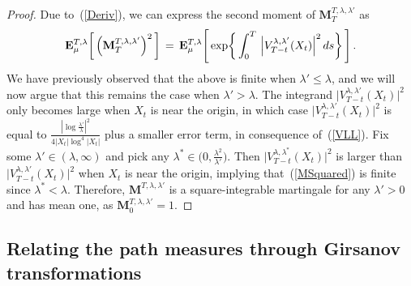 \documentclass[10pt]{article}
\numberwithin{equation}{section}
\theoremstyle{definition}
\begin{document}
\begin{proof}
Due to~(\ref{Deriv}), we can express the second moment of $\mathbf{M}^{T,\lambda,\lambda'}_T$ as
\begin{align}\label{MSquared}
\mathbf{E}^{T,\lambda}_{\mu}\bigg[ \,\Big( \mathbf{M}^{T,\lambda,\lambda'}_T\Big)^2 \,\bigg]\,=\,  \mathbf{E}^{T,\lambda}_{\mu}\Bigg[\,\textup{exp}\bigg\{ \int_0^T  \,\Big|V^{\lambda,\lambda'}_{T-t}(X_t)\Big|^2 \,ds \bigg\} \,\Bigg]\,.
\end{align}
We have previously observed that the above is finite when $\lambda'\leq \lambda$, and we will now argue that this remains the case when $\lambda'>\lambda$.   The integrand $\big|V^{\lambda,\lambda'}_{T-t}(X_t)\big|^2$  only becomes large when $X_t$ is near the origin, in which case $\big|V^{\lambda,\lambda'}_{T-t}(X_t)\big|^2$ is equal to $ \frac{ |\log \frac{\lambda'}{\lambda}|^2 }{4|X_t|\log^4|X_t| } $ plus a smaller error term, in consequence of~(\ref{VLL}).    Fix some $\lambda'\in (\lambda,\infty)$ and pick any $\lambda^*\in \big(0,\frac{\lambda^2}{\lambda'}\big)$. Then  $\big|V^{\lambda,\lambda^*}_{T-t}(X_t)\big|^2$ is larger than $\big|V^{\lambda,\lambda'}_{T-t}(X_t)\big|^2$ when $X_t$ is near the origin, implying that~(\ref{MSquared}) is finite since $\lambda^*<\lambda$.  Therefore, $\mathbf{M}^{T,\lambda,\lambda'} $ is a  square-integrable martingale for any $\lambda'>0$ and has mean one,  as $\mathbf{M}^{T,\lambda,\lambda'}_0=1 $.
\end{proof}




\subsection{Relating the path measures through  Girsanov transformations}\label{SubsectionGirsanov}
\end{document}
